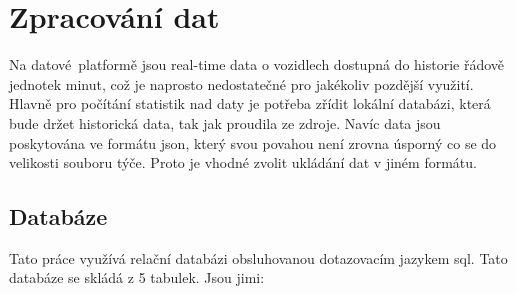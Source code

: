 
\chapter{Zpracování dat}

Na datové platformě jsou real-time data o vozidlech dostupná do historie řádově jednotek minut, což je naprosto nedostatečné pro jakékoliv pozdější využití. Hlavně pro počítání statistik nad daty je potřeba zřídit lokální databázi, která bude držet historická data, tak jak proudila ze zdroje. Navíc data jsou poskytována ve formátu \gls{json}, který svou povahou není zrovna úsporný co se do velikosti souboru týče. Proto je vhodné zvolit ukládání dat v jiném formátu.

\section{Databáze}

Tato práce využívá relační databázi obsluhovanou dotazovacím jazykem \gls{sql}. Tato databáze se skládá z 5 tabulek. Jsou jimi:

